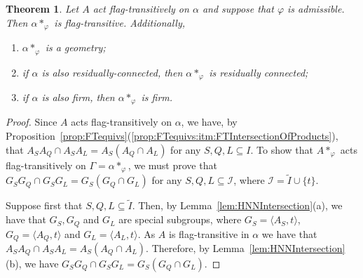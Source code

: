 \documentclass[11pt,letterpaper]{amsart}
\newtheorem{thm}[prop]{Theorem}
\newcommand{\II}{\mathcal{I}}
\begin{document}
 \begin{thm}\label{thm:FT_HNN_RC_FRM}
     Let $A$ act flag-transitively on $\alpha$ and suppose that $\varphi$ is admissible. Then $\alpha*_\varphi$ is flag-transitive.
    Additionally, 
     \begin{enumerate}
         \item $\alpha*_\varphi$ is a geometry;
         \item if $\alpha$ is also residually-connected, then $\alpha*_\varphi$ is residually connected;
         \item if $\alpha$ is also firm, then $\alpha*_\varphi$ is firm.
     \end{enumerate}
 \end{thm}
 \begin{proof}
     Since $A$ acts flag-transitively on $\alpha$, we have, by Proposition~\ref{prop:FTequivs}(\ref{prop:FTequivs:itm:FTIntersectionOfProducts}), that  $A_S A_Q \cap A_S A_L = A_S(A_Q\cap A_L)$ for any $S,Q,L\subseteq I$.
     To show that $A*_\varphi$ acts flag-transitively on $\Gamma=\alpha*_\varphi$, we must prove that $G_SG_Q \cap G_SG_L = G_S(G_Q\cap G_L)$ for any $S,Q,L\subseteq \II$, where $\II=\widetilde{I}\cup\{t\}$.
    

    Suppose first that $S,Q,L\subseteq \widetilde{I}$. Then, by Lemma~\ref{lem:HNNIntersection}(a), we have that $G_S, G_Q$ and $G_L$ are special subgroups, where $G_S = \langle A_S, t\rangle$, $G_Q = \langle A_Q, t\rangle$ and $G_L = \langle A_L, t\rangle$.
    As $A$ is flag-transitive in $\alpha$ we have that $A_SA_Q \cap A_SA_L = A_S(A_Q\cap A_L)$. Therefore, by Lemma~\ref{lem:HNNIntersection}(b), we have $G_SG_Q \cap G_SG_L = G_S(G_Q\cap G_L)$.


\end{proof}
\end{document}
